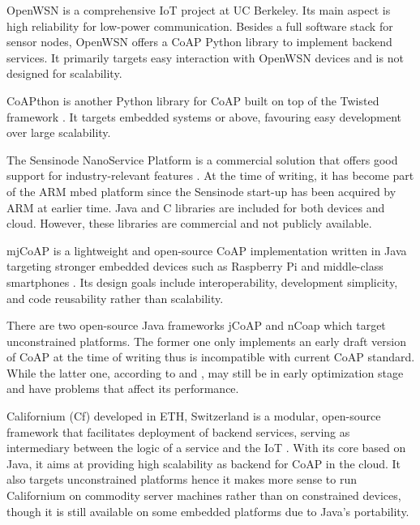 OpenWSN \cite{open-wsn} is a comprehensive IoT project at UC Berkeley. Its main aspect is high reliability for low-power communication. Besides a full software stack for sensor nodes, OpenWSN offers a CoAP Python library \cite{openwsn_python} to implement backend services. It primarily targets easy interaction with OpenWSN devices and is not designed for scalability.

CoAPthon \cite{7389028}\cite{coapthon_code} is another Python library for CoAP built on top of the Twisted framework \cite{twisted}. It targets embedded systems or above, favouring easy development over large scalability. 

The Sensinode NanoService Platform is a commercial solution that offers good support for industry-relevant features \cite{kovatsch2015scalable}. At the time of writing, it has become part of the ARM mbed platform \cite{mbed} since the Sensinode start-up has been acquired by ARM at earlier time. Java and C libraries are included for both devices and cloud. However, these libraries are commercial and not publicly available. 

mjCoAP is a lightweight and open-source CoAP implementation written in Java targeting stronger embedded devices such as Raspberry Pi and middle-class smartphones \cite{cirani2015mjcoap}\cite{kovatsch2015scalable}. Its design goals include interoperability, development simplicity, and code reusability rather than scalability.  

There are two open-source Java frameworks jCoAP \cite{jcoap} and nCoap \cite{ncoap} which target unconstrained platforms. The former one only implements an early draft version of CoAP at the time of writing thus is incompatible with current CoAP standard. While the latter one, according to \cite{lanter2013scalability} and \cite{kovatsch2015scalable}, may still be in early optimization stage and have problems that affect its performance.

Californium (Cf) \cite{californium} developed in ETH, Switzerland is a modular, open-source framework that facilitates deployment of backend services, serving as intermediary between the logic of a service and the IoT \cite{lanter2013scalability} \cite{kovatsch2014californium}\cite{kovatsch2015scalable}. With its core based on Java, it aims at providing high scalability as backend for CoAP in the cloud. It also targets unconstrained platforms hence it makes more sense to run Californium on commodity server machines rather than on constrained devices, though it is still available on some embedded platforms due to Java's portability. 


